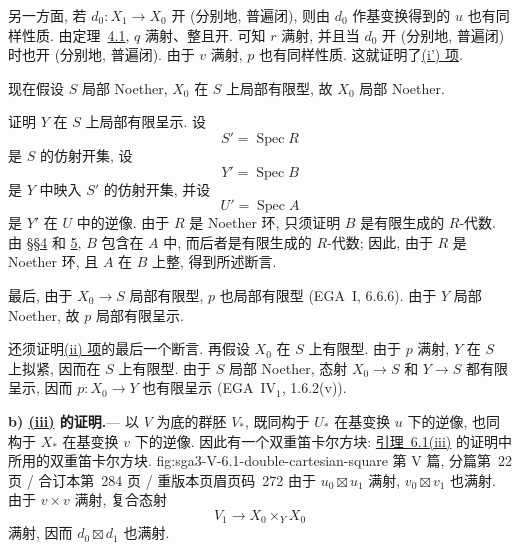 
另一方面, 若 \(d_0:X_1\to X_0\) 开 (分别地, 普遍闭),
则由 \(d_0\) 作基变换得到的 \(u\) 也有同样性质.
由定理~\hyperref[thm:sga3-V-4.1]{4.1}, \(q\) 满射、整且开.
可知 \(r\) 满射, 并且当 \(d_0\) 开 (分别地, 普遍闭) 时也开 (分别地, 普遍闭).
由于 \(v\) 满射, \(p\) 也有同样性质.
这就证明了\hyperref[lem:sga3-V-6.1-ip]{(i') 项}.

现在假设 \(S\) 局部 Noether, \(X_0\) 在 \(S\) 上局部有限型,
故 \(X_0\) 局部 Noether.

证明 \(Y\) 在 \(S\) 上局部有限呈示. 设
\[
  S'=\operatorname{Spec}R
\]
是 \(S\) 的仿射开集, 设
\[
  Y'=\operatorname{Spec}B
\]
是 \(Y\) 中映入 \(S'\) 的仿射开集, 并设
\[
  U'=\operatorname{Spec}A
\]
是 \(Y'\) 在 \(U\) 中的逆像. 由于 \(R\) 是 Noether 环,
只须证明 \(B\) 是有限生成的 \(R\)-代数.
由 \hyperref[sec:sga3-V-4]{\S\S4} 和 \hyperref[sec:sga3-V-5]{5},
\(B\) 包含在 \(A\) 中, 而后者是有限生成的 \(R\)-代数;
因此, 由于 \(R\) 是 Noether 环, 且 \(A\) 在 \(B\) 上整, 得到所述断言.

最后, 由于 \(X_0\to S\) 局部有限型, \(p\) 也局部有限型
(EGA~I, 6.6.6). 由于 \(Y\) 局部 Noether, 故 \(p\) 局部有限呈示.

还须证明\hyperref[lem:sga3-V-6.1-ii]{(ii) 项}的最后一个断言.
再假设 \(X_0\) 在 \(S\) 上有限型.
由于 \(p\) 满射, \(Y\) 在 \(S\) 上拟紧, 因而在 \(S\) 上有限型.
由于 \(S\) 局部 Noether, 态射 \(X_0\to S\) 和 \(Y\to S\)
都有限呈示, 因而 \(p:X_0\to Y\) 也有限呈示
(EGA~IV\(_1\), 1.6.2(v)).

\medskip
{}\label{par:sga3-V-6-b}%
\noindent\textbf{b) \hyperref[lem:sga3-V-6.1-iii]{(iii)} 的证明.}---%
以 \(V\) 为底的群胚 \(V_\ast\), 既同构于 \(U_\ast\)
在基变换 \(u\) 下的逆像, 也同构于 \(X_\ast\)
在基变换 \(v\) 下的逆像. 因此有一个双重笛卡尔方块:
  {\hyperref[lem:sga3-V-6.1-iii]{引理~6.1(iii)} 的证明中所用的双重笛卡尔方块.}
  {fig:sga3-V-6.1-double-cartesian-square}
  {第 V 篇, 分篇第~22 页 / 合订本第~284 页 / 重版本页眉页码~272}
由于 \(u_0\boxtimes u_1\) 满射, \(v_0\boxtimes v_1\) 也满射.
由于 \(v\times v\) 满射, 复合态射
\[
  V_1\longrightarrow X_0\times_Y X_0
\]
满射, 因而 \(d_0\boxtimes d_1\) 也满射.

